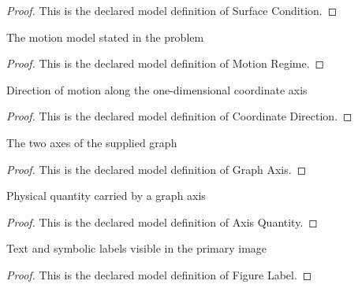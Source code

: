 \begin{proof}
  This is the declared model definition of Surface Condition.
\end{proof}
\begin{definition}
  \label{def:physics:phyx-mini-0275:phyxminiproblems-problemphyxmini0275-motionregime}
  The motion model stated in the problem
\end{definition}
\begin{proof}
  This is the declared model definition of Motion Regime.
\end{proof}
\begin{definition}
  \label{def:physics:phyx-mini-0275:phyxminiproblems-problemphyxmini0275-coordinatedirection}
  Direction of motion along the one-dimensional coordinate axis
\end{definition}
\begin{proof}
  This is the declared model definition of Coordinate Direction.
\end{proof}
\begin{definition}
  \label{def:physics:phyx-mini-0275:phyxminiproblems-problemphyxmini0275-graphaxis}
  The two axes of the supplied graph
\end{definition}
\begin{proof}
  This is the declared model definition of Graph Axis.
\end{proof}
\begin{definition}
  \label{def:physics:phyx-mini-0275:phyxminiproblems-problemphyxmini0275-axisquantity}
  Physical quantity carried by a graph axis
\end{definition}
\begin{proof}
  This is the declared model definition of Axis Quantity.
\end{proof}
\begin{definition}
  \label{def:physics:phyx-mini-0275:phyxminiproblems-problemphyxmini0275-figurelabel}
  Text and symbolic labels visible in the primary image
\end{definition}
\begin{proof}
  This is the declared model definition of Figure Label.
\end{proof}

